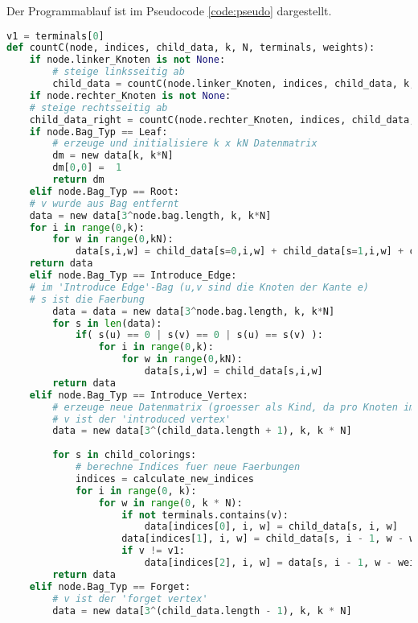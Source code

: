 Der Programmablauf ist im Pseudocode \ref{code:pseudo} dargestellt.

\begin{svgraybox}
\begin{lstlisting}[language=python,label={code:pseudo}, caption=Pseudocode für das dynamische Programm]
v1 = terminals[0]
def countC(node, indices, child_data, k, N, terminals, weights):
    if node.linker_Knoten is not None:
        # steige linksseitig ab
        child_data = countC(node.linker_Knoten, indices, child_data, k, N, terminals, weights)
    if node.rechter_Knoten is not None:
	# steige rechtsseitig ab
	child_data_right = countC(node.rechter_Knoten, indices, child_data, k, N, terminals, weights)
    if node.Bag_Typ == Leaf:
    	# erzeuge und initialisiere k x kN Datenmatrix
    	dm = new data[k, k*N]
    	dm[0,0] =  1
    	return dm
    elif node.Bag_Typ == Root:
	# v wurde aus Bag entfernt
	data = new data[3^node.bag.length, k, k*N]
	for i in range(0,k):
		for w in range(0,kN):
			data[s,i,w] = child_data[s=0,i,w] + child_data[s=1,i,w] + child_data[s=2,i,w]
	return data			
    elif node.Bag_Typ == Introduce_Edge:
	# im 'Introduce Edge'-Bag (u,v sind die Knoten der Kante e)
	# s ist die Faerbung
		data = data = new data[3^node.bag.length, k, k*N]
		for s in len(data):
			if( s(u) == 0 | s(v) == 0 | s(u) == s(v) ):
				for i in range(0,k):
					for w in range(0,kN):
						data[s,i,w] = child_data[s,i,w]
        return data
    elif node.Bag_Typ == Introduce_Vertex:
        # erzeuge neue Datenmatrix (groesser als Kind, da pro Knoten im Bag drei neue Faerbungen)
        # v ist der 'introduced vertex' 
        data = new data[3^(child_data.length + 1), k, k * N]
        
        for s in child_colorings:
        	# berechne Indices fuer neue Faerbungen
        	indices = calculate_new_indices
            for i in range(0, k):
                for w in range(0, k * N):
                    if not terminals.contains(v):
                        data[indices[0], i, w] = child_data[s, i, w]
                    data[indices[1], i, w] = child_data[s, i - 1, w - weights(v)]
                    if v != v1:
                        data[indices[2], i, w] = data[s, i - 1, w - weights.get(introduced_vertex)]
        return data
    elif node.Bag_Typ == Forget:
    	# v ist der 'forget vertex'
        data = new data[3^(child_data.length - 1), k, k * N]
		

\end{lstlisting}
\end{svgraybox}
